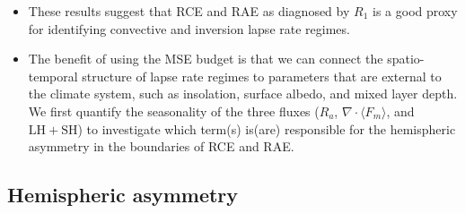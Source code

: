 \documentclass{ametsocV5}
\begin{document}
\begin{itemize}
  \item These results suggest that RCE and RAE as diagnosed by \(R_{1}\) is a good proxy for identifying convective and inversion lapse rate regimes.
  \item The benefit of using the MSE budget is that we can connect the spatio-temporal structure of lapse rate regimes to parameters that are external to the climate system, such as insolation, surface albedo, and mixed layer depth. We first quantify the seasonality of the three fluxes (\(R_{a}\), \(\nabla\cdot\langle F_{m}\rangle\), and \(\mathrm{LH+SH}\)) to investigate which term(s) is(are) responsible for the hemispheric asymmetry in the boundaries of RCE and RAE.

\end{itemize}


\subsection{Hemispheric asymmetry} \label{subsec:asym}
\end{document}
